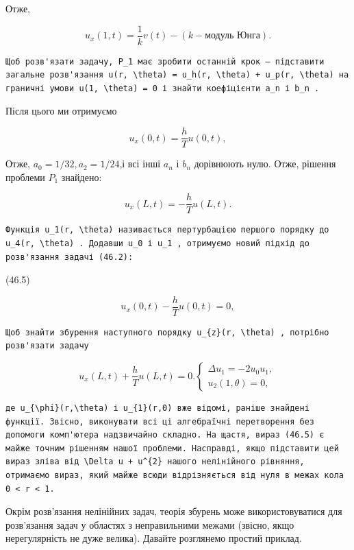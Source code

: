 \documentclass[
  ukrainian,
]{article}
\begin{document}
Отже,

\[
u_{x}(1, t) = \frac{1}{k} v(t) - (k - \text{модуль Юнга}).
\]

\begin{verbatim}
Щоб розв'язати задачу, P_1 має зробити останній крок — підставити загальне розв'язання u(r, \theta) = u_h(r, \theta) + u_p(r, \theta) на граничні умови u(1, \theta) = 0 і знайти коефіцієнти a_n і b_n .
\end{verbatim}

Після цього ми отримуємо

\[
u_{x}(0, t) = \frac{h}{T} u(0, t),
\]

Отже, \(a_0=1/32 , a_2=1/24\),і всі інші \(a_n\) і \(b_n\) дорівнюють
нулю. Отже, рішення проблеми \(P_1\) знайдено:

\[
u_{x}(L, t) = -\frac{h}{T} u(L, t).
\]

\begin{verbatim}
Функція u_1(r, \theta) називається пертурбацією першого порядку до u_4(r, \theta) . Додавши u_0 і u_1 , отримуємо новий підхід до розв'язання задачі (46.2):
\end{verbatim}

(46.5)

\[
u_{x}(0, t) - \frac{h}{T}u(0, t) = 0,
\]

\begin{verbatim}
Щоб знайти збурення наступного порядку u_{z}(r, \theta) , потрібно розв'язати задачу
\end{verbatim}

\[
u_{x}(L, t) + \frac{h}{T}u(L, t) = 0.
\begin{cases} \Delta u_{1} = -2u_{0}u_{1}, \\ u_{2}(1, \theta) = 0, \end{cases}
\]

\begin{verbatim}
де u_{\phi}(r,\theta) і u_{1}(r,0) вже відомі, раніше знайдені функції. Звісно, виконувати всі ці алгебраїчні перетворення без допомоги комп'ютера надзвичайно складно. На щастя, вираз (46.5) є майже точним рішенням нашої проблеми. Насправді, якщо підставити цей вираз зліва від \Delta u + u^{2} нашого нелінійного рівняння, отримаємо вираз, який майже всюди відрізняється від нуля в межах кола 0 < r < 1.
\end{verbatim}

Окрім розв'язання нелінійних задач, теорія збурень може
використовуватися для розв'язання задач у областях з неправильними
межами (звісно, якщо нерегулярність не дуже велика). Давайте розглянемо
простий приклад.
\end{document}
